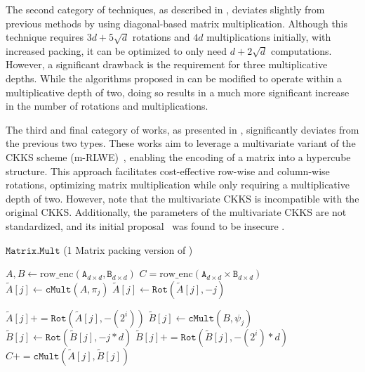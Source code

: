 \documentclass[journal=tosc,final]{iacrtrans}
\begin{document}
The second category of techniques, as described in \cite{mult1_d3}, deviates slightly from previous methods by using diagonal-based matrix multiplication. Although this technique requires $3d+5\sqrt{d}$ rotations and $4d$ multiplications initially, with increased packing, it can be optimized to only need $d+2\sqrt{d}$ computations. However, a significant drawback is the requirement for three multiplicative depths. While the algorithms proposed in \cite{mult1_d3} can be modified to operate within a multiplicative depth of two, doing so results in a much more significant increase in the number of rotations and multiplications.

The third and final category of works, as presented in \cite{mult1_d2_pc, mult2_d2_pc, mult3_d2_pc}, significantly deviates from the previous two types. These works aim to leverage a multivariate variant of the CKKS scheme (m-RLWE)~\cite{mheaan}, enabling the encoding of a matrix into a hypercube structure. This approach facilitates cost-effective row-wise and column-wise rotations, optimizing matrix multiplication while only requiring a multiplicative depth of two. However, note that the multivariate CKKS is incompatible with the original CKKS. Additionally, the parameters of the multivariate CKKS are not standardized, and its initial proposal~\cite{mrlwe} was found to be insecure \cite{mrlwe_attack}.



\begin{algorithm}
    \renewcommand{\algorithmicensure}{\textbf{Out:}}
    \caption{$\mathtt{Matrix.Mult}$ (1 Matrix packing version of \cite{mult2_d2}) }
    \begin{algorithmic}[1]
        \Require $A,B \gets \text{row\_enc}(\mathtt{A}_{d\times d},\mathtt{B}_{d\times d})$
        \Ensure  $C=\text{row\_enc}(\mathtt{A}_{d\times d}\times\mathtt{B}_{d\times d})$ 
        \Statex \LeftComment{\textcolor{gray}{// Preprocess $A$ }}
        \State $\tilde{A}[j] \gets  \texttt{cMult}(A, \pi_{j} )$ \Comment{\textcolor{gray}{Splitting $A$ column-wise}}
        \State $\tilde{A}[j] \gets  \texttt{Rot}(\tilde{A}[j],-j)$ \Comment{\textcolor{gray}{ Right align all the columns}}
        
        	\Comment{\textcolor{gray}{ Replicate the column}}
        \State $\tilde{A}[j] +=  \texttt{Rot}(\tilde{A}[j], -(2^i) )$
     \EndFor
     \EndFor
     \Statex \LeftComment{\textcolor{gray}{// Preprocess $B$ }}
        \State $\tilde{B}[j] \gets  \texttt{cMult}(B, \psi_{j} )$ \Comment{\textcolor{gray}{ Splitting $B$ row-wise}}
        \State $\tilde{B}[j] \gets  \texttt{Rot}(\tilde{B}[j],-j*d)$ \Comment{\textcolor{gray}{Top align all the rows}}
        	\Comment{\textcolor{gray}{ Replicate the rows}}
        \State $\tilde{B}[j] +=  \texttt{Rot}(\tilde{B}[j], -(2^i)*d )$
     \EndFor
     \EndFor
     \Statex \LeftComment{\textcolor{gray}{// Compute $C$ }}
        \State $C += \texttt{cMult}(\tilde{A}[j],\tilde{B}[j] )$ 
     \EndFor
    \end{algorithmic}\label{algo:mult_1}
    \end{algorithm}
\end{document}

